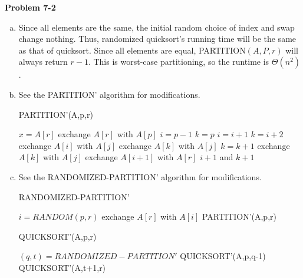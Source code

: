 \documentclass{article}
\begin{document}
\noindent\textbf{Problem 7-2}\\
\begin{enumerate}[a.]
\item  Since all elements are the same, the initial random choice of index and swap change nothing.  Thus, randomized quicksort's running time will be the same as that of quicksort.  Since all elements are equal, PARTITION$(A,P,r)$ will always return $r-1$.  This is worst-case partitioning, so the runtime is $\Theta(n^2)$. \\

\item  See the PARTITION' algorithm for modifications.
\begin{algorithm}
\caption{PARTITION'(A,p,r)}
\begin{algorithmic}[1]
\State $x = A[r]$
\State exchange $A[r]$ with $A[p]$
\State $i=p-1$
\State $k = p$
		\State $i=i+1$
		\State $k = i+2$
		\State exchange $A[i]$ with $A[j]$
		\State exchange $A[k]$ with $A[j]$
	\EndIf
		\State $k = k+1$
		\State exchange $A[k]$ with $A[j]$
	\EndIf
\EndFor
\State exchange $A[i+1]$ with $A[r]$
\State \Return $i+1$ and $k+1$
\end{algorithmic}
\end{algorithm}


\item See the RANDOMIZED-PARTITION' algorithm for modifications.  
\begin{algorithm}
\caption{RANDOMIZED-PARTITION'}
\begin{algorithmic}[1]
\State $i=RANDOM(p,r)$
\State exchange $A[r]$ with $A[i]$
\State \Return PARTITION'(A,p,r)
\end{algorithmic}
\end{algorithm}

\begin{algorithm}
\caption{QUICKSORT'(A,p,r)}
\begin{algorithmic}[1]
	\State $(q,t) = RANDOMIZED-PARTITION'$
	\State QUICKSORT'(A,p,q-1)
	\State QUICKSORT'(A,t+1,r)
\EndIf
\end{algorithmic}
\end{algorithm}


\end{enumerate}
\end{document}
